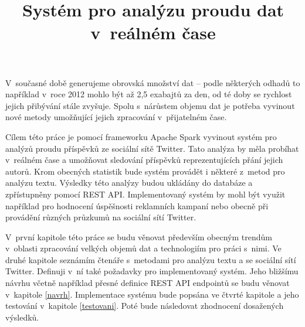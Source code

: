 \documentclass[thesis=B,czech]{FITthesis}[2012/06/26]
\title{Systém pro analýzu proudu dat v~reálném čase}
\begin{document}

\begin{introduction}
	V~současné době generujeme obrovská množství dat -- podle některých odhadů to například v~roce 2012 mohlo být až 2,5 exabajtů za den\cite{bbc-bigdata}, od té doby se rychlost jejich přibývání stále zvyšuje. Spolu s~nárůstem objemu dat je potřeba vyvinout nové metody umožňující jejich zpracování v~přijatelném čase. 
	
	Cílem této práce je pomocí frameworku Apache Spark vyvinout systém pro analýzů proudu příspěvků ze sociální sítě Twitter. Tato analýza by měla probíhat v~reálném čase a umožňovat sledování příspěvků reprezentujících přání jejich autorů. Krom obecných statistik bude systém provádět i některé z~metod pro analýzu textu. Výsledky této analýzy budou ukládány do databáze a zpřístupněny pomocí REST API. Implementovaný systém by mohl být využit například pro hodnocení úspěšnosti reklamních kampaní nebo obecně při provádění různých průzkumů na sociální sítí Twitter. 
	
	V~první kapitole této práce se budu věnovat především obecným trendům v~oblasti zpracování velkých objemů dat a technologiím pro práci s~nimi. Ve druhé kapitole seznámím čtenáře s~metodami pro analýzu textu a se sociální sítí Twitter. Definuji v~ní také požadavky pro implementovaný systém. Jeho bližšímu návrhu včetně například přesné definice REST API endpointů se budu věnovat v~kapitole \ref{navrh}. Implementace systému bude popsána ve čtvrté kapitole a jeho testování v~kapitole \ref{testovani}. Poté bude následovat zhodnocení dosažených výsledků. 
	

	
\end{introduction}

%
\end{document}
